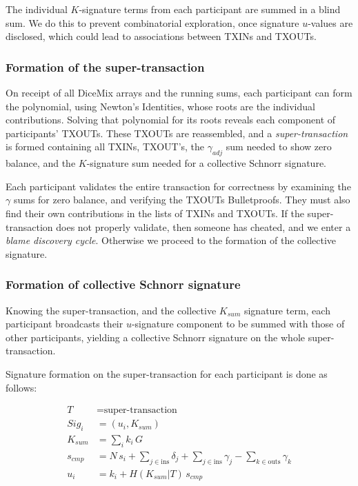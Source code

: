 \documentclass[a4paper, 10pt, conference]{ieeeconf}
\begin{document}
The individual $K$-signature terms from each participant are summed in a blind sum. We do this to prevent combinatorial exploration, once signature $u$-values are disclosed, which could lead to associations between TXINs and TXOUTs.

\subsubsection{Formation of the super-transaction} On receipt of all DiceMix arrays and the running sums, each participant can form the polynomial, using Newton's Identities, whose roots are the individual contributions. Solving that polynomial for its roots reveals each component of participants' TXOUTs. These TXOUTs are reassembled, and a \textit{super-transaction} is formed containing all TXINs, TXOUT's, the $\gamma_{adj}$ sum needed to show zero balance, and the $K$-signature sum needed for a collective Schnorr signature.

Each participant validates the entire transaction for correctness by examining the $\gamma$ sums for zero balance, and verifying the TXOUTs Bulletproofs. They must also find their own contributions in the lists of TXINs and TXOUTs. If the super-transaction does not properly validate, then someone has cheated, and we enter a \textit{blame discovery cycle}. Otherwise we proceed to the formation of the collective signature. 

\subsubsection{Formation of collective Schnorr signature} Knowing the super-transaction, and the collective $K_{sum}$ signature term, each participant broadcasts their $u$-signature component to be summed with those of other participants, yielding a collective Schnorr signature on the whole super-transaction.

Signature formation on the super-transaction for each participant is done as follows:

\begin{align*}
T &= \text{super-transaction} \\
Sig_i &= (u_i, K_{sum}) \\
K_{sum} &= \sum_i{k_i \, G} \\
s_{cmp} &= N \, s_i + \sum_{j \in \text{ins}} {\delta_j} + \sum_{j \in \text{ins}} {\gamma_j} - \sum_{k \in \text{outs}} {\gamma_k} \\
u_i &= k_i + H(K_{sum} | T) \,  s_{cmp}\\
\end{align*}
\end{document}
